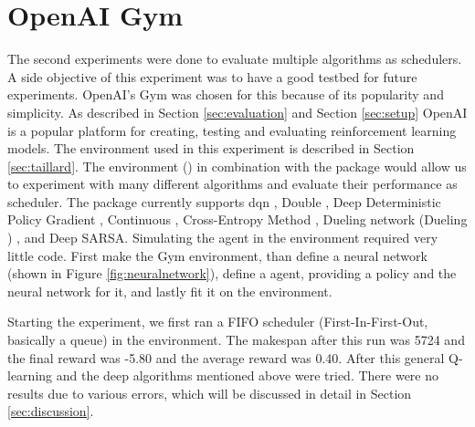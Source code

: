 

\section{OpenAI Gym}

The second experiments were done to evaluate multiple \rl algorithms as
schedulers. A side objective of this experiment was to have a good testbed for
future experiments. OpenAI's Gym was chosen for this because of its popularity
and simplicity. As described in Section \ref{sec:evaluation} and Section
\ref{sec:setup} OpenAI is a popular platform for creating, testing and
evaluating reinforcement learning models. The environment used in this
experiment is described in Section \ref{sec:taillard}. The \jss environment
() in combination with the 
package would allow us to experiment
with many different \rl algorithms and evaluate their performance as
scheduler. The  package currently supports \acrfull{dqn}
\cite{mnih2013}, Double \dqn \cite{hasselt2016}, Deep Deterministic Policy
Gradient \cite{lillicrap2015}, Continuous \dqn \cite{gu2016}, Cross-Entropy
Method \cite{szita2006}, Dueling network \dqn (Dueling \dqn) \cite{wang2016},
and Deep SARSA. Simulating the agent in the \jss environment required very
little code. First make the Gym environment, than define a neural network
(shown in Figure \ref{fig:neuralnetwork}), define a \rl agent, providing a
policy and the neural network for it, and lastly fit it on the environment.



Starting the experiment, we first ran a FIFO scheduler (First-In-First-Out,
basically a queue) in the environment. The makespan after this run was 5724
and the final reward was -5.80 and the average reward was 0.40. After this
general Q-learning and the deep \rl algorithms mentioned above were tried.
There were no results due to various errors, which will be discussed in detail
in Section \ref{sec:discussion}.
